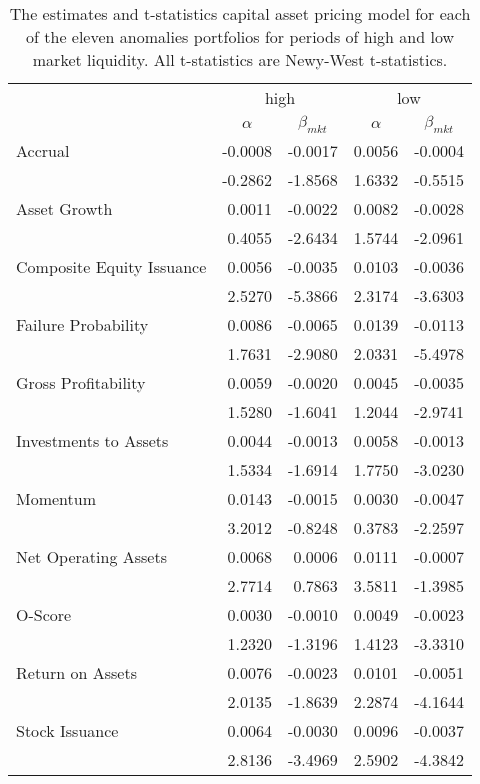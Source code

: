 
\begin{table}[]
    \caption{\newline The estimates and t-statistics capital asset pricing model for each of the eleven anomalies portfolios for periods of high and low market liquidity. All t-statistics are Newy-West t-statistics.}
    \label{tab:liq-capm}
    \begin{tabular}{@{}lrrrr@{}}
    \toprule
     & \multicolumn{2}{c}{high} & \multicolumn{2}{c}{low} \\ \cmidrule(l){2-5} 
     & \multicolumn{1}{c}{$\alpha$} & \multicolumn{1}{c}{$\beta_{mkt}$} & \multicolumn{1}{c}{$\alpha$} & \multicolumn{1}{c}{$\beta_{mkt}$} \\ \midrule
    Accrual & -0.0008 & -0.0017 & 0.0056 & -0.0004 \\
     & -0.2862 & -1.8568 & 1.6332 & -0.5515 \\
    Asset Growth & 0.0011 & -0.0022 & 0.0082 & -0.0028 \\
     & 0.4055 & -2.6434 & 1.5744 & -2.0961 \\
    Composite Equity Issuance & 0.0056 & -0.0035 & 0.0103 & -0.0036 \\
     & 2.5270 & -5.3866 & 2.3174 & -3.6303 \\
    Failure Probability & 0.0086 & -0.0065 & 0.0139 & -0.0113 \\
     & 1.7631 & -2.9080 & 2.0331 & -5.4978 \\
    Gross Profitability & 0.0059 & -0.0020 & 0.0045 & -0.0035 \\
     & 1.5280 & -1.6041 & 1.2044 & -2.9741 \\
    Investments to Assets & 0.0044 & -0.0013 & 0.0058 & -0.0013 \\
     & 1.5334 & -1.6914 & 1.7750 & -3.0230 \\
    Momentum & 0.0143 & -0.0015 & 0.0030 & -0.0047 \\
     & 3.2012 & -0.8248 & 0.3783 & -2.2597 \\
    Net Operating Assets & 0.0068 & 0.0006 & 0.0111 & -0.0007 \\
     & 2.7714 & 0.7863 & 3.5811 & -1.3985 \\
    O-Score & 0.0030 & -0.0010 & 0.0049 & -0.0023 \\
     & 1.2320 & -1.3196 & 1.4123 & -3.3310 \\
    Return on Assets & 0.0076 & -0.0023 & 0.0101 & -0.0051 \\
     & 2.0135 & -1.8639 & 2.2874 & -4.1644 \\
    Stock Issuance & 0.0064 & -0.0030 & 0.0096 & -0.0037 \\
     & 2.8136 & -3.4969 & 2.5902 & -4.3842 \\ \bottomrule
    \end{tabular}
    \end{table}
